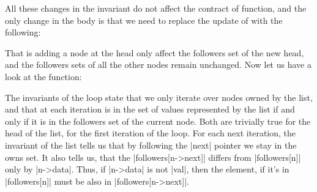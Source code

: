 
\noindent
All these changes in the invariant do not affect
the contract of  function, and the only change in the body
is that we need to replace the update of  with the following:


\noindent
That is adding a node at the head only affect the followers set of the new head,
and the followers sets of all the other nodes remain unchanged.
Now let us have a look at the  function:


\noindent
The invariants of the  loop state that we only iterate over
nodes owned by the list, and that at each iteration  is in the
set of values represented by the list if and only if it is in the followers
set of the current node.
Both are trivially true for the head of the list, for the first iteration
of the loop.
For each next iteration, the invariant of the list tells us that by following
the \vcc|next| pointer we stay in the owns set.
It also tells us, that the \vcc|followers[n->next]| differs
from \vcc|followers[n]| only by \vcc|n->data|.
Thus, if \vcc|n->data| is not \vcc|val|, then the element,
if it's in \vcc|followers[n]| must be also in \vcc|followers[n->next]|.

%


